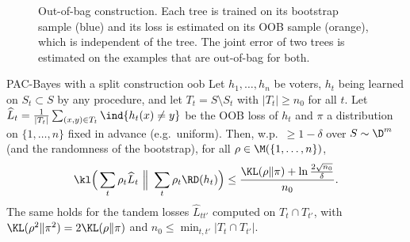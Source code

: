 \begin{figure}[t]
\centering
{}
\caption{Out-of-bag construction. Each tree is trained on its bootstrap
sample (blue) and its loss is estimated on its OOB sample (orange), which is
independent of the tree. The joint error of two trees is estimated on the
examples that are out-of-bag for both.}
\label{fig:oob}
\end{figure}

\begin{theorem}{PAC-Bayes with a split construction \citep{thiemann2017strongly,lorenzen2019pac}}{oob}
Let $h_1,\dots,h_n$ be voters, $h_t$ being learned on $S_t\subset S$ by any
procedure, and let $T_t=S\setminus S_t$ with $|T_t|\geq n_0$ for all $t$. Let
$\widehat L_t=\frac{1}{|T_t|}\sum_{(x,y)\in T_t}\ind{h_t(x)\neq y}$ be the OOB
loss of $h_t$ and $\pi$ a distribution on $\{1,\dots,n\}$ fixed in advance
(e.g.\ uniform). Then, w.p.\ $\geq1-\delta$ over $S\sim\D^m$ (and the
randomness of the bootstrap), for all $\rho\in\M(\{1,\dots,n\})$,
\begin{equation}\label{eq:oob}
\kl\Big(\sum_t\rho_t\widehat L_t\ \Big\|\ \sum_t\rho_t\RD(h_t)\Big)\leq\frac{\KL(\rho\|\pi)+\ln\frac{2\sqrt{n_0}}{\delta}}{n_0}.
\end{equation}
The same holds for the tandem losses $\widehat L_{tt'}$ computed on $T_t\cap T_{t'}$,
with $\KL(\rho^2\|\pi^2)=2\KL(\rho\|\pi)$ and $n_0\leq\min_{t,t'}|T_t\cap T_{t'}|$.
\end{theorem}

